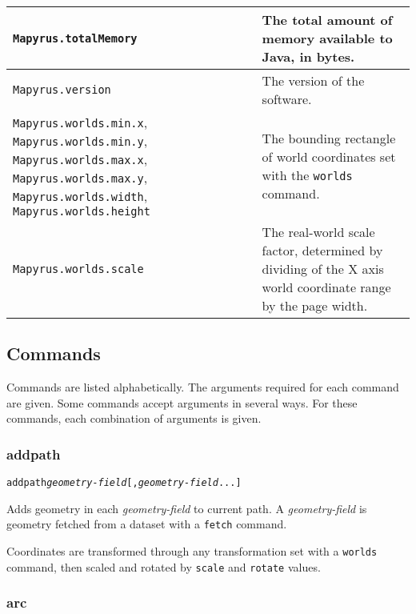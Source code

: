 \begin{longtable}{|p{5cm}|p{7cm}|}
\hline

\texttt{Mapyrus.totalMemory} &
The total amount of memory available to Java, in bytes. \\

\hline

\texttt{Mapyrus.version} &
The version of the software. \\

\hline

\texttt{Mapyrus.worlds.min.x},
\texttt{Mapyrus.worlds.min.y},
\texttt{Mapyrus.worlds.max.x},
\texttt{Mapyrus.worlds.max.y},
\texttt{Mapyrus.worlds.width},
\texttt{Mapyrus.worlds.height} &
The bounding rectangle of world coordinates set with the 
\texttt{worlds} command. \\

\hline

\texttt{Mapyrus.worlds.scale} &
The real-world scale factor, determined by
dividing of the X axis world coordinate range
by the page width. \\

\end{longtable}

\subsection{Commands}

Commands are listed alphabetically.  The arguments required for each command
are given.  Some commands accept arguments in several ways.  For these
commands, each combination of arguments is given.

\subsubsection{addpath}

\begin{alltt}
addpath \textit{geometry-field} [, \textit{geometry-field} ...]
\end{alltt}

Adds geometry in each \textit{geometry-field} to current path.
A \textit{geometry-field} is geometry fetched from a dataset
with a \texttt{fetch} command.

Coordinates are transformed through any
transformation set with a \texttt{worlds} command,
then scaled and rotated by \texttt{scale}
and \texttt{rotate} values.

\subsubsection{arc}

